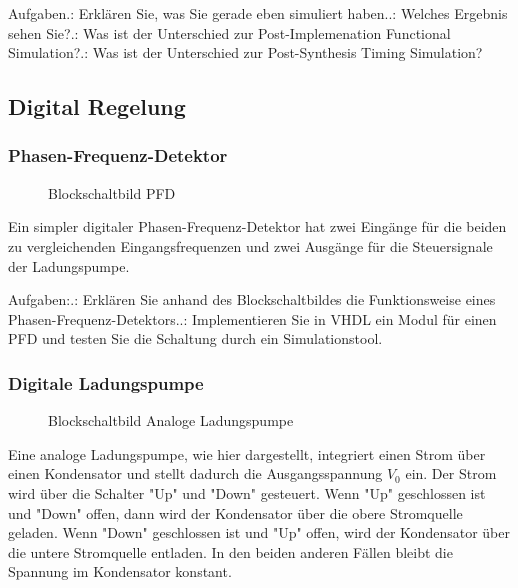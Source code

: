 \documentclass{article}
\begin{document}
Aufgaben.: Erkl\"aren Sie, was Sie gerade eben simuliert haben..: Welches Ergebnis sehen Sie?.: Was ist der Unterschied zur Post-Implemenation Functional Simulation?.: Was ist der Unterschied zur Post-Synthesis Timing Simulation?

\subsection{Digital Regelung}
\subsubsection{Phasen-Frequenz-Detektor}
\begin{figure}[H]
\begin{center}
\caption{Blockschaltbild PFD}
\end{center}
\end{figure}
Ein simpler digitaler Phasen-Frequenz-Detektor hat zwei Eing\"ange f\"ur die beiden zu vergleichenden Eingangsfrequenzen und zwei Ausg\"ange f\"ur die Steuersignale der Ladungspumpe.\citep{PFD} \newline


Aufgaben:.: Erkl\"aren Sie anhand des Blockschaltbildes die Funktionsweise eines Phasen-Frequenz-Detektors..: Implementieren Sie in VHDL ein Modul f\"ur einen PFD und testen Sie die Schaltung durch ein Simulationstool.

\subsubsection{Digitale Ladungspumpe}
\begin{figure}[H]
\begin{center}
\caption{Blockschaltbild Analoge Ladungspumpe}
\end{center}
\end{figure}
Eine analoge Ladungspumpe, wie hier dargestellt, integriert einen Strom \"uber einen Kondensator und stellt dadurch die Ausgangsspannung $V_{0}$ ein. Der Strom wird \"uber die Schalter "Up" und "Down" gesteuert. Wenn "Up" geschlossen ist und "Down" offen, dann wird der Kondensator \"uber die obere Stromquelle geladen. Wenn "Down" geschlossen ist und "Up" offen, wird der Kondensator \"uber die untere Stromquelle entladen. In den beiden anderen F\"allen bleibt die Spannung im Kondensator konstant. \citep{CP} \newline
\end{document}
